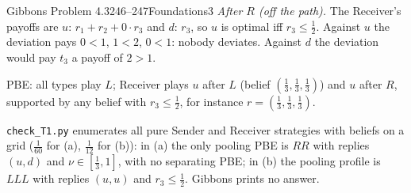 \begin{exsol}{Gibbons Problem 4.3}{246--247}{Foundations}{3}
\emph{After $R$ (off the path).} The Receiver's payoffs are $u$: $r_1 + r_2 + 0 \cdot r_3$ and
$d$: $r_3$, so $u$ is optimal iff $r_3 \le \frac12$. Against $u$ the deviation pays $0 < 1$,
$1 < 2$, $0 < 1$: nobody deviates. Against $d$ the deviation would pay $t_3$ a payoff of $2 > 1$.

PBE: all types play $L$; Receiver plays $u$ after $L$ (belief $(\frac13,\frac13,\frac13)$) and $u$
after $R$, supported by any belief with $r_3 \le \frac12$, for instance $r = (\frac13, \frac13, \frac13)$.

\verify \texttt{check\_T1.py} enumerates all pure Sender and Receiver strategies with beliefs on
a grid ($\frac1{60}$ for (a), $\frac1{12}$ for (b)): in (a) the only pooling PBE is $RR$ with replies
$(u, d)$ and $\nu \in [\frac13, 1]$, with no separating PBE; in (b) the pooling profile is $LLL$ with
replies $(u, u)$ and $r_3 \le \frac12$. Gibbons prints no answer.

\end{exsol}
